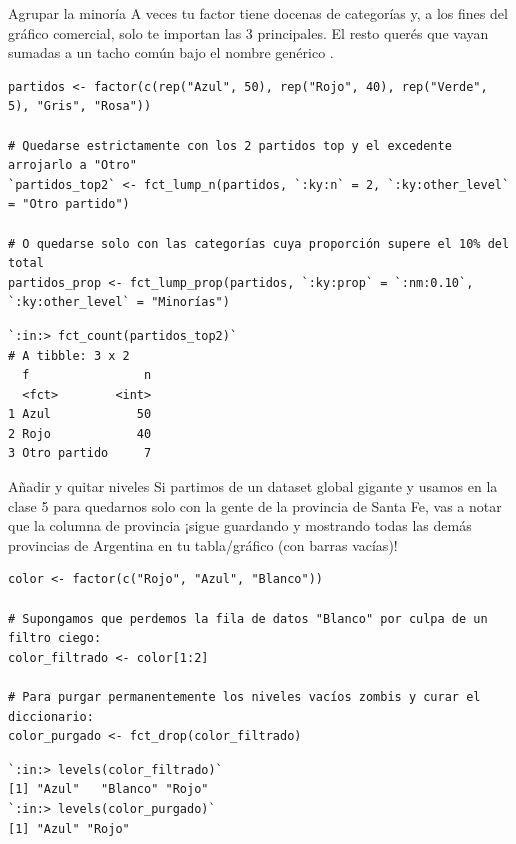 \documentclass[8pt]{beamer}
\begin{document}
	\begin{frame}[fragile]{Agrupar la minoría}
		A veces tu factor tiene docenas de categorías y, a los fines del gráfico comercial, solo te importan las 3 principales. El resto querés que vayan sumadas a un tacho común bajo el nombre genérico .
		
\begin{lstlisting}[style=RScript]
partidos <- factor(c(rep("Azul", 50), rep("Rojo", 40), rep("Verde", 5), "Gris", "Rosa"))

# Quedarse estrictamente con los 2 partidos top y el excedente arrojarlo a "Otro"
`partidos_top2` <- fct_lump_n(partidos, `:ky:n` = 2, `:ky:other_level` = "Otro partido")

# O quedarse solo con las categorías cuya proporción supere el 10% del total
partidos_prop <- fct_lump_prop(partidos, `:ky:prop` = `:nm:0.10`, `:ky:other_level` = "Minorías")
\end{lstlisting}
\begin{lstlisting}[style=RConsole]
`:in:> fct_count(partidos_top2)`
# A tibble: 3 x 2
  f                n
  <fct>        <int>
1 Azul            50
2 Rojo            40
3 Otro partido     7
\end{lstlisting}
	\end{frame}

	\begin{frame}[fragile]{Añadir y quitar niveles}
		Si partimos de un dataset global gigante y usamos  en la clase 5 para quedarnos solo con la gente de la provincia de Santa Fe, vas a notar que la columna de provincia ¡sigue guardando y mostrando todas las demás provincias de Argentina en tu tabla/gráfico (con barras vacías)!

\begin{lstlisting}[style=RScript]
color <- factor(c("Rojo", "Azul", "Blanco"))

# Supongamos que perdemos la fila de datos "Blanco" por culpa de un filtro ciego:
color_filtrado <- color[1:2]

# Para purgar permanentemente los niveles vacíos zombis y curar el diccionario:
color_purgado <- fct_drop(color_filtrado)
\end{lstlisting}
\begin{lstlisting}[style=RConsole]
`:in:> levels(color_filtrado)`
[1] "Azul"   "Blanco" "Rojo"  
`:in:> levels(color_purgado)`
[1] "Azul" "Rojo"
\end{lstlisting}
	\end{frame}
	
\end{document}
